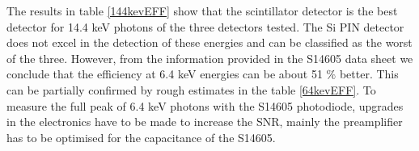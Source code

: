 \par
The results in table \ref{144kevEFF} show that the scintillator detector is the best detector for 14.4 keV photons of the three detectors tested. The Si PIN detector does not excel in the detection of these energies and can be classified as the worst of the three. However, from the information provided in the S14605 data sheet \cite{datS14605} we conclude that the efficiency at 6.4 keV energies can be about 51 $\%$ better. This can be partially confirmed by rough estimates in the table \ref{64kevEFF}. To measure the full peak of 6.4 keV photons with the S14605 photodiode, upgrades in the electronics have to be made to increase the SNR, mainly the preamplifier has to be optimised for the capacitance of the S14605.



